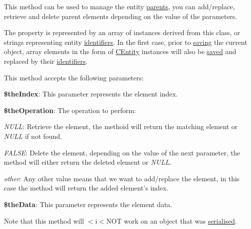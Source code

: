This method can be used to manage the entity \hyperlink{}{parents}, you can add/replace, retrieve and delete parent elements depending on the value of the parameters.

The property is represented by an array of instances derived from this class, or strings representing entity \hyperlink{}{identifiers}. In the first case, prior to \hyperlink{class_c_persistent_object_ad076a9a2baf73bba0784deb135a3b7b7}{saving} the current object, array elements in the form of \hyperlink{class_c_entity}{C\-Entity} instances will also be \hyperlink{class_c_persistent_object_ad076a9a2baf73bba0784deb135a3b7b7}{saved} and replaced by their \hyperlink{}{identifiers}.

This method accepts the following parameters\-:


\begin{DoxyItemize}
\item {\bfseries \$the\-Index}\-: This parameter represents the element index. 
\item {\bfseries \$the\-Operation}\-: The operation to perform\-: 
\begin{DoxyItemize}
\item {\itshape N\-U\-L\-L\/}\-: Retrieve the element, the methoid will return the matching element or {\itshape N\-U\-L\-L\/} if not found. 
\item {\itshape F\-A\-L\-S\-E\/}\-: Delete the element, depending on the value of the next parameter, the method will either return the deleted element or {\itshape N\-U\-L\-L\/}. 
\item {\itshape other\/}\-: Any other value means that we want to add/replace the element, in this case the method will return the added element's index. 
\end{DoxyItemize}
\item {\bfseries \$the\-Data}\-: This parameter represents the element data. 
\end{DoxyItemize}

Note that this method will $<$i$<$N\-O\-T work on an object that was \hyperlink{class_c_mongo_data_wrapper_a0d37f7b47e1a1ac48846f6d10d08d846}{serialised}.


